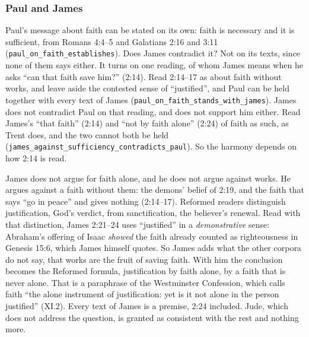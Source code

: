 \documentclass[11pt,paper=\testimonypaper,DIV=13,parskip=false]{scrartcl}
\begin{document}
\subsubsection*{Paul and James}
Paul’s message about faith can be stated on its own: faith is necessary and it is sufficient, from Romans 4:4–5 and Galatians 2:16 and 3:11 (\texttt{paul\_\allowbreak{}on\_\allowbreak{}faith\_\allowbreak{}establishes}). Does James contradict it? Not on its texts, since none of them says either. It turns on one reading, of whom James means when he asks “can that faith save him?” (2:14). Read 2:14–17 as about faith without works, and leave aside the contested sense of “justified”, and Paul can be held together with every text of James (\texttt{paul\_\allowbreak{}on\_\allowbreak{}faith\_\allowbreak{}stands\_\allowbreak{}with\_\allowbreak{}james}). James does not contradict Paul on that reading, and does not support him either. Read James’s “that faith” (2:14) and “not by faith alone” (2:24) of faith as such, as Trent does, and the two cannot both be held (\texttt{james\_\allowbreak{}against\_\allowbreak{}sufficiency\_\allowbreak{}contradicts\_\allowbreak{}paul}). So the harmony depends on how 2:14 is read.

James does not argue for faith alone, and he does not argue against works. He argues against a faith without them: the demons’ belief of 2:19, and the faith that says “go in peace” and gives nothing (2:14–17). Reformed readers distinguish justification, God’s verdict, from sanctification, the believer’s renewal. Read with that distinction, James 2:21–24 uses “justified” in a \emph{demonstrative} sense: Abraham’s offering of Isaac \emph{showed} the faith already counted as righteousness in Genesis 15:6, which James himself quotes. So James adds what the other corpora do not say, that works are the fruit of saving faith. With him the conclusion becomes the Reformed formula, justification by faith alone, by a faith that is never alone. That is a paraphrase of the Westminster Confession, which calls faith “the alone instrument of justification: yet is it not alone in the person justified” (XI.2). Every text of James is a premise, 2:24 included. Jude, which does not address the question, is granted as consistent with the rest and nothing more.
\end{document}
